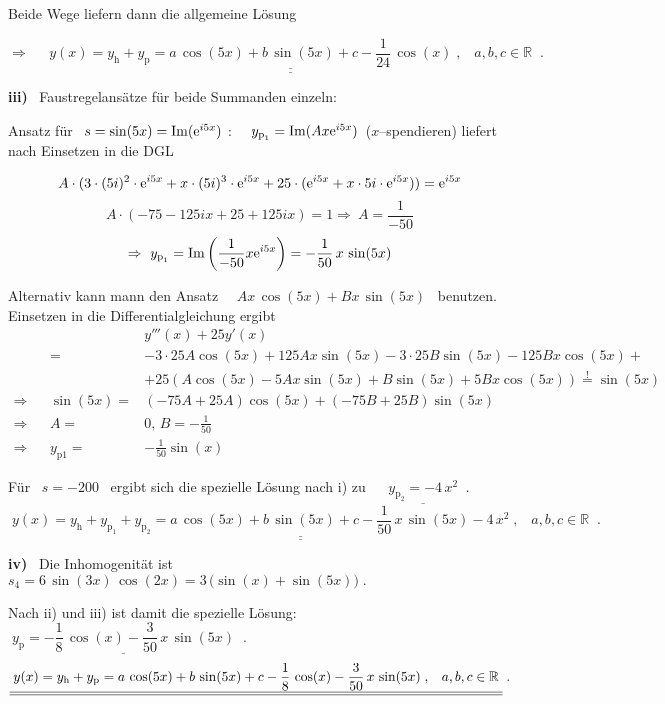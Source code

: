 {\begin{enumerate}
Beide Wege liefern dann die allgemeine L\"osung

\[
\Rightarrow \;\;\;\;\underline{\underline{\;y(x)=y_{\text{h}}+y_{\text{p}} = 
a\,\cos(5x)+b\,\sin(5x)+c-\dfrac{1}{24}\,\cos (x)\;,\;\;\;a,b,c\in \mathbb{R}\;}}\;. 
\]

\textbf{iii)} \ Faustregelans\"atze f\"ur beide Summanden einzeln:

Ansatz f\"ur \ $s=\sin(5x)=\operatorname{Im}(\mathrm{e}^{i5x})$ :
\ \ $y_{\text{p}_{1}}=\operatorname{Im}(Ax\mathrm{e}^{i5x})$\ (\glqq$x$--spendieren\grqq) liefert nach Einsetzen in die DGL

\[A\cdot(3\cdot(5i)^2\cdot\mathrm{e}^{i5x}+x\cdot(5i)^3\cdot\mathrm{e}^{i5x}+25\cdot(\mathrm{e}^{i5x}+x\cdot5i\cdot\mathrm{e}^{i5x}))=\mathrm{e}^{i5x}\]
\[A\cdot(-75-125ix+25+125ix)=1\Rightarrow\ A=\dfrac{1}{-50}\]
\[\Rightarrow\ y_{\text{p}_{1}}=\operatorname{Im}\left(\dfrac{1}{-50}x\EH{i5x}\right)=-\dfrac{1}{50}\,x\,\sin(5x)\]

Alternativ kann mann den Ansatz \ \ $Ax\,\cos(5x)+Bx\,\sin (5x)$ \ benutzen.
Einsetzen in die Differentialgleichung ergibt
\begin{align*}
&&&y'''(x)+25y'(x)\\
&&=& -3\cdot 25A\cos(5x)+125Ax\sin(5x) -3\cdot 25 B\sin(5x) -125 B x\cos(5x)+ \\
&& & + 25(A\cos(5x)-5Ax\sin(5x)+ B\sin(5x)+5Bx\cos(5x)) \overset!= \sin(5x)\\
\Rightarrow &&\sin(5x)=& (-75A+25 A) \cos(5x) + (-75B+25B)\sin(5x)\\
\Rightarrow && A=&0,\, B=-\frac 1{50}\\
\Rightarrow&& y_{\text{p1}}=&-\frac 1{50}\sin(x)
\end{align*}

F\"ur \ $s=-200$ \ ergibt sich die spezielle L\"osung nach i) zu \ \ $\underline{\;y_{\text{p}_{2}}=-4\,x^{2}\;}\;.$
\[
\underline{\underline{\;y(x)=y_{\text{h}}+y_{\text{p}_{1}}+y_{\text{p}_{2}} = a\,\cos(5x)+b\,\sin(5x)+c-\dfrac{1}{50}\,x\,\sin(5x)-4\,x^{2}\;,\;\;\;a,b,c\in \mathbb{R}\;}}\;. 
\]

\textbf{iv)} \ Die Inhomogenit\"at ist \ \ $s_{4}=6\,\sin (3x)\,\cos(2x)=3\,\big(\sin (x)+\sin (5x)\big)\;.$

Nach ii) und iii) ist damit die spezielle L\"osung:\ \ \ \ $\underline{\;y_{\text{p}} = -\dfrac{1}{8}\,\cos (x)-\dfrac{3}{50}\,x\,\sin(5x)\;}\;.$%
\[
\underline{\underline{\;y(x)=y_{\text{h}}+y_{\text{p}}=a\,\cos (5x)+b\,\sin (5x)+c-\dfrac{1}{8}\,\cos (x)-\dfrac{3}{50}\,x\,\sin(5x)\;,\;\;\;a,b,c\in \Bbb{R}\;}}\;. 
\]


\end{enumerate}}
